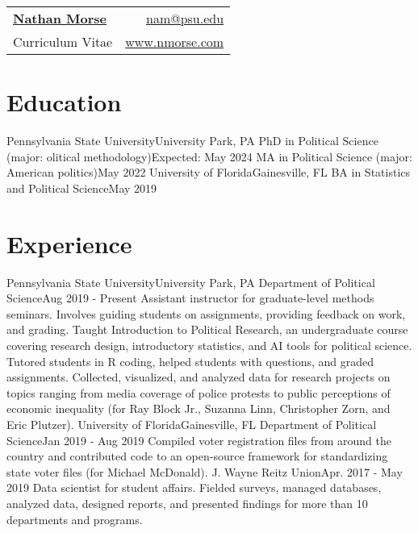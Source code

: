 \thispagestyle{empty}

\begin{tabular*}{\textwidth}{l@{\extracolsep{\fill}}r}
  \textbf{\href{http://nmorse.com/}{\Large Nathan Morse}} & \href{mailto:nam@psu.edu}{nam@psu.edu}\\
  Curriculum Vitae & \href{http://nmorse.com/}{www.nmorse.com} \\
\end{tabular*}


\section{Education}
  \resumeSubHeadingListStart
    \resumeEducation
      {Pennsylvania State University}{University Park, PA}
      {PhD in Political Science (major: olitical methodology)}{Expected: May 2024}
      {MA in Political Science (major: American politics)}{May 2022}
    \resumeSubheading
      {University of Florida}{Gainesville, FL}
      {BA in Statistics and Political Science}{May 2019}
  \resumeSubHeadingListEnd
  

\section{Experience}
  \resumeSubHeadingListStart
    \resumeSubheading
      {Pennsylvania State University}{University Park, PA}
      {Department of Political Science}{Aug 2019 - Present}
      \resumeItemListStart
          {Assistant instructor for graduate-level methods seminars. Involves guiding students on assignments, providing feedback on work, and grading.}
          {Taught Introduction to Political Research, an undergraduate course covering research design, introductory statistics, and AI tools for political science.}
          {Tutored students in R coding, helped students with questions, and graded assignments.}
          {Collected, visualized, and analyzed data for research projects on topics ranging from media coverage of police protests to public perceptions of economic inequality (for Ray Block Jr., Suzanna Linn, Christopher Zorn, and Eric Plutzer). }
      \resumeItemListEnd
    \resumeSubheading
      {University of Florida}{Gainesville, FL}
      {Department of Political Science}{Jan 2019 - Aug 2019}
      \resumeItemListStart
          {Compiled voter registration files from around the country and contributed code to an open-source framework for standardizing state voter files (for Michael McDonald).}
      \resumeItemListEnd
        \resumeSubSubheading
         {J. Wayne Reitz Union}{Apr. 2017 - May 2019}
         \resumeItemListStart
              {Data scientist for student affairs. Fielded surveys, managed databases, analyzed data, designed reports, and presented findings for more than 10 departments and programs.}
         \resumeItemListEnd
        \resumeSubHeadingListEnd